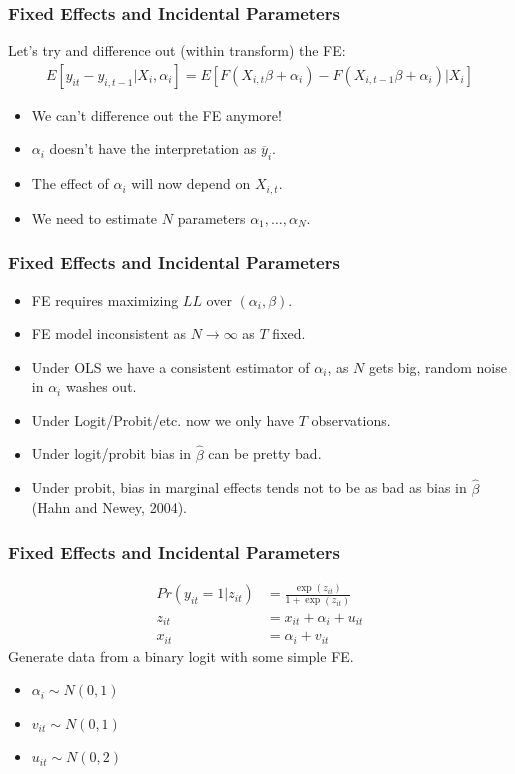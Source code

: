 \documentclass[xcolor=pdftex,dvipsnames,table,mathserif,aspectratio=169]{beamer}
\begin{document}
\begin{frame}
\frametitle{ Fixed Effects and Incidental Parameters}
Let's try and difference out (within transform) the FE:
\begin{eqnarray*}
E[y_{it}-y_{i,t-1} | X_i,\alpha_i] =E[F(X_{i,t} \beta +\alpha_i)- F(X_{i,t-1} \beta +\alpha_i) | X_i]
\end{eqnarray*}
\begin{itemize}
\item We can't difference out the FE anymore!
\item $\alpha_i$ doesn't have the interpretation as $\overline{y}_i$.
\item The effect of $\alpha_i$ will now depend on $X_{i,t}$.
\item We need to estimate $N$ parameters $\alpha_1, \ldots,\alpha_N$.
\end{itemize}
\end{frame}

\begin{frame}
\frametitle{ Fixed Effects and Incidental Parameters}
\begin{itemize}
\item FE requires maximizing $LL$ over $(\alpha_i,\beta)$.
\item FE model inconsistent as $N\rightarrow \infty$ as $T$ fixed.
\item Under OLS we have a \alert{consistent estimator} of $\alpha_i$, as $N$ gets big, random noise in $\alpha_i$ washes out.
\item Under Logit/Probit/etc. now we only have $T$ observations.
\item Under logit/probit bias in $\hat{\beta}$ can be pretty bad.
\item Under probit, bias in \alert{marginal effects} tends not to be as bad as bias in $\hat{\beta}$ (Hahn and Newey, 2004).
\end{itemize}
\end{frame}


\begin{frame}
\frametitle{ Fixed Effects and Incidental Parameters}
\begin{align*}
Pr(y_{it}=1 | z_{it}) &= \frac{\exp(z_{it} )}{1+\exp(z_{it})}\\
z_{it} &= x_{it} + \alpha_i + u_{it}\\
x_{it} &=  \alpha_i + v_{it}
\end{align*}
Generate data from a binary logit with some simple FE.
\begin{itemize}
\item $\alpha_i \sim N(0,1)$
\item $v_{it} \sim N(0,1)$
\item $u_{it} \sim N(0,2)$
\end{itemize}
\end{frame}
\end{document}
